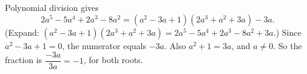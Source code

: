 Polynomial division gives
\[2a^5-5a^4+2a^3-8a^2=(a^2-3a+1)(2a^3+a^2+3a)-3a .\]
(Expand: $(a^2-3a+1)(2a^3+a^2+3a)=2a^5-5a^4+2a^3-8a^2+3a$.) Since $a^2-3a+1=0$, the numerator equals $-3a$. Also $a^2+1=3a$, and $a\ne0$. So the fraction is $\dfrac{-3a}{3a}=\boxed{-1}$, for both roots.
